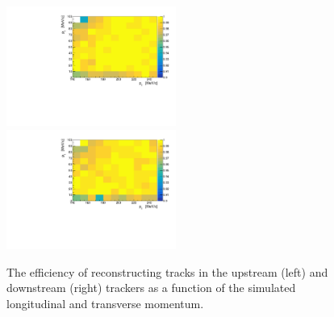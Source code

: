   \begin{figure}[tb]
    \centering
    \includegraphics[width=0.495\textwidth, angle=0]{08-Performance/upstream_track_efficiency.pdf}
    \includegraphics[width=0.495\textwidth, angle=0]{08-Performance/downstream_track_efficiency.pdf}\\
    \caption{\label{fig:track_efficiency} The efficiency of reconstructing tracks in the upstream (left) and downstream (right) trackers as a function of the simulated longitudinal and transverse momentum.}
  \end{figure}

  
  
